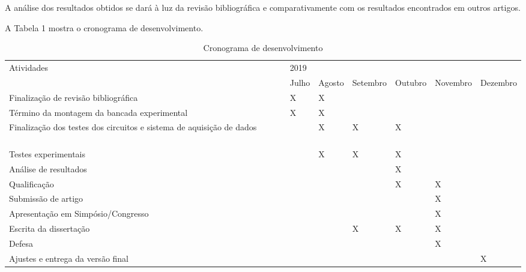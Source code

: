 \documentclass[
	12pt,				
	oneside,			
	a4paper,			
	english,			
	brazil				
	]{abntex2ppgsi}
\begin{document}
A análise dos resultados obtidos se dará à luz da revisão bibliográfica e comparativamente com os resultados encontrados em outros artigos. 

A Tabela 1 mostra o cronograma de desenvolvimento.


\begin{table}
\centering
\caption{Cronograma de desenvolvimento}
\resizebox{\textwidth}{!}
{\begin{tabular}{|l|l|l|l|l|l|l|}

\hline
\multirow{2}{*}{Atividades }                                                  & \multicolumn{6}{l|}{2019}                                  \\ 
\cline{2-7}
                                                                              & Julho & Agosto & Setembro & Outubro & Novembro & Dezembro  \\ 
\hline
Finalização de revisão bibliográfica~ ~ ~ ~ ~                                 & X     & X      &          &         &          &           \\ 
\hline
Término da montagem da bancada experimental~ ~ ~ ~ ~                          & X     & X      &          &         &          &           \\ 
\hline
Finalização dos testes dos circuitos e sistema de aquisição de dados~ ~ ~ ~ ~ &       & X      & X        & X       &          &           \\ 
\hline
Testes experimentais~ ~ ~ ~ ~~                                                &       & X      & X        & X       &          &           \\ 
\hline
Análise de resultados~ ~ ~ ~ ~                                                &       &        &          & X       &          &           \\ 
\hline
Qualificação~ ~ ~ ~ ~                                                         &       &        &          & X       & X        &           \\ 
\hline
Submissão de artigo~ ~ ~ ~ ~                                                  &       &        &          &         & X        &           \\ 
\hline
Apresentação em Simpósio/Congresso~ ~ ~ ~ ~                                   &       &        &          &         & X        &           \\ 
\hline
Escrita da dissertação~ ~ ~ ~ ~                                               &       &        & X        & X       & X        &           \\ 
\hline
Defesa~ ~ ~ ~ ~~                                                              &       &        &          &         & X        &           \\ 
\hline
Ajustes e entrega da versão final~ ~ ~ ~ ~                                    &       &        &          &         &          & X         \\
\hline
\end{tabular}}
\label{tab:ExemploDeTabela1}
\end{table}
\end{document}
